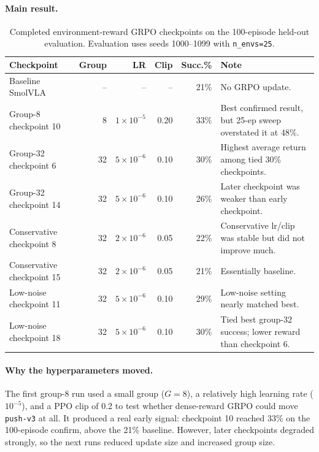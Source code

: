 \paragraph{Main result.}
\begin{table}[H]
\centering
\small
\begin{tabular}{lrrrrl}
\toprule
Checkpoint & Group & LR & Clip & Succ.\% & Note \\
\midrule
Baseline SmolVLA & -- & -- & -- & 21\% & No GRPO update. \\
Group-8 checkpoint 10 & 8 & $1{\times}10^{-5}$ & 0.20 & 33\% & Best confirmed result, but 25-ep sweep overstated it at 48\%. \\
Group-32 checkpoint 6 & 32 & $5{\times}10^{-6}$ & 0.10 & 30\% & Highest average return among tied 30\% checkpoints. \\
Group-32 checkpoint 14 & 32 & $5{\times}10^{-6}$ & 0.10 & 26\% & Later checkpoint was weaker than early checkpoint. \\
Conservative checkpoint 8 & 32 & $2{\times}10^{-6}$ & 0.05 & 22\% & Conservative lr/clip was stable but did not improve much. \\
Conservative checkpoint 15 & 32 & $2{\times}10^{-6}$ & 0.05 & 21\% & Essentially baseline. \\
Low-noise checkpoint 11 & 32 & $5{\times}10^{-6}$ & 0.10 & 29\% & Low-noise setting nearly matched best. \\
Low-noise checkpoint 18 & 32 & $5{\times}10^{-6}$ & 0.10 & 30\% & Tied best group-32 success; lower reward than checkpoint 6. \\
\bottomrule
\end{tabular}
\caption{Completed environment-reward GRPO checkpoints on the 100-episode held-out evaluation. Evaluation uses seeds 1000--1099 with \texttt{n\_envs=25}.}
\label{tab:env-grpo-100ep-results}
\end{table}

\paragraph{Why the hyperparameters moved.}
The first group-8 run used a small group ($G=8$), a relatively high learning rate ($10^{-5}$), and a PPO clip of 0.2 to test whether dense-reward GRPO could move \texttt{push-v3} at all. It produced a real early signal: checkpoint 10 reached 33\% on the 100-episode confirm, above the 21\% baseline. However, later checkpoints degraded strongly, so the next runs reduced update size and increased group size.

